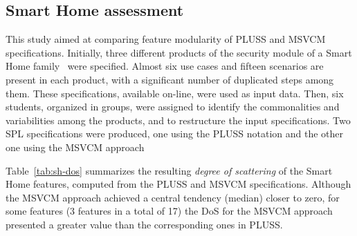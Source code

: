 \documentclass{sig-alternate}
\begin{document}
\subsection{Smart Home assessment}

This study aimed at comparing feature modularity of PLUSS and MSVCM
specifications. Initially, three different products of the security module of a
Smart Home family~\cite{Pohl:2005aa} were specified. Almost six use cases and
fifteen scenarios are present in each product, with a significant number of
duplicated steps among them. These specifications, available on-line, were used
as input data. Then, six students, organized in groups, were assigned to identify
the commonalities and variabilities among the products, and to restructure the
input specifications. Two SPL specifications were produced, one using the PLUSS
notation and the other one using the MSVCM approach




Table~\ref{tab:sh-dos} summarizes the resulting \emph{degree of scattering} of
the Smart Home features, computed from the PLUSS and MSVCM specifications.
Although the MSVCM approach achieved a central tendency (median) closer to
zero, for some features (3 features in a total of 17) the DoS for the MSVCM approach
presented a greater value than the corresponding ones in PLUSS.
\end{document}
